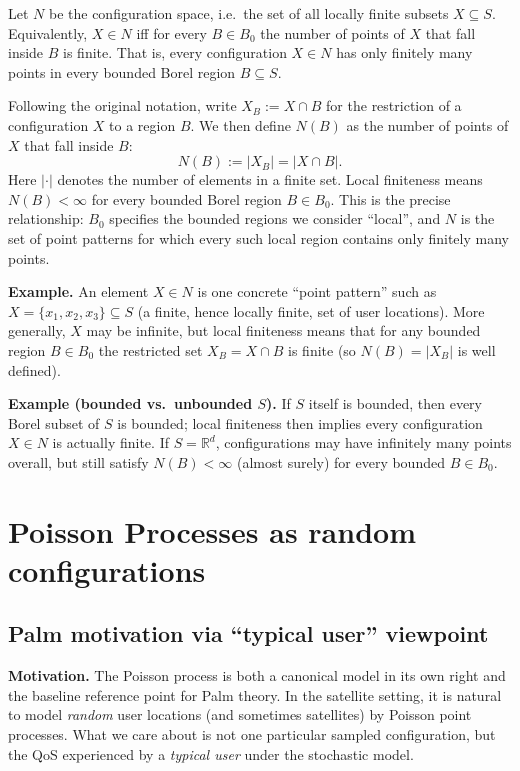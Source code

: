 Let $N$ be the configuration space, i.e.\ the set of all locally finite subsets $X\subseteq S$.
Equivalently, $X\in N$ iff for every $B\in B_0$ the number of points of $X$ that fall inside $B$ is finite.
That is, every configuration $X\in N$ has only finitely many points in every bounded Borel region $B\subseteq S$.


Following the original notation, write $X_B := X\cap B$ for the restriction of a configuration $X$ to a region $B$.
We then define $N(B)$ as the number of points of $X$ that fall inside $B$:
$$
N(B):=\lvert X_B\rvert=\lvert X\cap B\rvert.
$$
Here $|\cdot|$ denotes the number of elements in a finite set.
Local finiteness means $N(B)<\infty$ for every bounded Borel region $B\in B_0$.
This is the precise relationship: $B_0$ specifies the bounded regions we consider ``local'', and
$N$ is the set of point patterns for which every such local region contains only finitely many points.

\noindent\textbf{Example.}
An element $X\in N$ is one concrete ``point pattern'' such as $X=\{x_1,x_2,x_3\}\subseteq S$ (a finite, hence
locally finite, set of user locations). More generally, $X$ may be infinite, but local finiteness means that for any bounded
region $B\in B_0$ the restricted set $X_B=X\cap B$ is finite (so $N(B)=|X_B|$ is well defined).

\noindent\textbf{Example (bounded vs.\ unbounded $S$).}
If $S$ itself is bounded, then every Borel subset of $S$ is bounded; local finiteness then implies
every configuration $X\in N$ is actually finite. If $S=\mathbb{R}^d$, configurations may have infinitely many
points overall, but still satisfy $N(B)<\infty$ (almost surely) for every bounded $B\in B_0$.

\section{Poisson Processes as random configurations}

\subsection{Palm motivation via ``typical user'' viewpoint}

\noindent\textbf{Motivation.}
The Poisson process is both a canonical model in its own right and the baseline reference point for Palm theory.
In the satellite setting, it is natural to model \emph{random} user locations (and sometimes satellites) by Poisson point
processes. What we care about is not one particular sampled configuration, but the QoS experienced by a \emph{typical
user} under the stochastic model.

